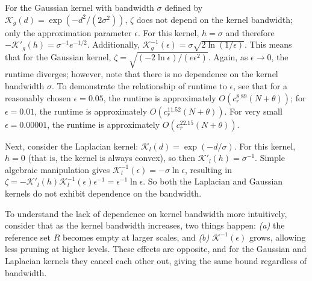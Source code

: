 

For the Gaussian kernel with bandwidth $\sigma$ defined by $\mathcal{K}_g(d) =
\exp(-d^2 / (2 \sigma^2))$, $\zeta$ does not
depend on the kernel bandwidth; only
the approximation parameter $\epsilon$.  For this kernel, $h = \sigma$ and
therefore $-\mathcal{K}'_g(h) = \sigma^{-1} e^{-1 / 2}$.  Additionally,
$\mathcal{K}_g^{-1}(\epsilon) = \sigma \sqrt{2 \ln (1 / \epsilon)}$.  This means
that for the Gaussian kernel, $\zeta = \sqrt{(-2 \ln \epsilon) / (e
\epsilon^2)}$.  Again, as $\epsilon \to 0$, the
runtime diverges; however, note that there is no dependence on the kernel
bandwidth $\sigma$.  To demonstrate the relationship of runtime to $\epsilon$,
see that for a reasonably chosen $\epsilon = 0.05$, the runtime is approximately
$O(c_r^{8.89} (N + \theta))$; for $\epsilon = 0.01$, the runtime is
approximately $O(c_r^{11.52} (N + \theta))$.  For very small $\epsilon =
0.00001$, the runtime is approximately $O(c_r^{22.15} (N + \theta))$.

Next, consider the Laplacian kernel:
$\mathcal{K}_l(d) = \exp(-d / \sigma)$.  For this kernel, $h = 0$ (that is, the
kernel is always convex), so then $\mathcal{K}'_l(h) = \sigma^{-1}$.  Simple
algebraic manipulation gives $\mathcal{K}^{-1}_l(\epsilon) = -\sigma \ln
\epsilon$, resulting in $\zeta = -\mathcal{K}'_l(h) \mathcal{K}^{-1}_l(\epsilon)
\epsilon^{-1} = \epsilon^{-1} \ln \epsilon$.  So both the Laplacian and Gaussian
kernels do not exhibit dependence on the bandwidth.

To understand the lack of dependence on kernel bandwidth more intuitively,
consider that as the kernel bandwidth increases, two things happen: {\it (a)}
the reference set $R$ becomes empty at larger scales, and {\it (b)}
$\mathcal{K}^{-1}(\epsilon)$ grows, allowing less pruning at higher levels.
These effects are opposite, and for the Gaussian and Laplacian kernels they
cancel each other out, giving the same bound regardless of bandwidth.


